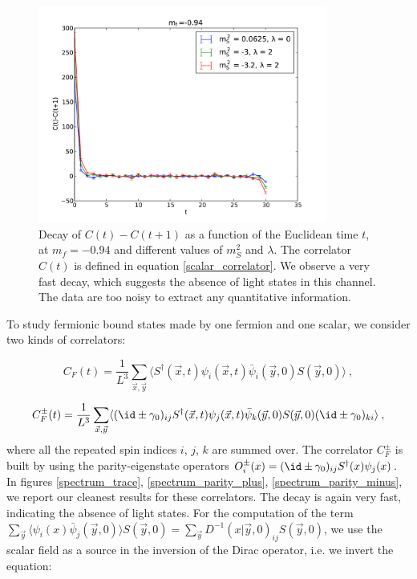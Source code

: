 \begin{figure}[thb] 
\begin{center}
  \includegraphics[width=9.5cm,clip]{pics/spectrum_scalar}  
  \end{center}
  \caption{Decay of $C(t) - C(t+1)$ as a function of the Euclidean time $t$, at $m_f = -0.94$ and different values of $m_S^2$ and $\lambda$. The correlator $C(t)$ is defined in equation \ref{scalar_correlator}. We observe a very fast decay, which suggests the absence of light states in this channel. The data are too noisy to extract any quantitative information.}
  \label{spectrum_scalar}
\end{figure}


To study fermionic bound states made by one fermion and one scalar, we consider two kinds of correlators:

\begin{equation}
C_F(t) =  \frac{1}{L^3} \sum_{\vec x,\vec y} \langle S^{\dagger}(\vec x, t) \psi_i(\vec x, t) \bar\psi_i(\vec y,0) S(\vec y,0) \rangle \: ,
\label{corr_trace}
\end{equation}


\begin{equation}
C^{\pm}_F(t) = \frac{1}{L^3} \sum_{\vec x,\vec y}\langle (\id \pm\gamma_0)_{ij} S^{\dagger}(\vec x,t) \psi_j(\vec x,t)\bar\psi_k(\vec y,0)S(\vec y,0) (\id \pm \gamma_0)_{ki} \rangle \: ,
\label{corr_pm}
\end{equation}
%
where all the repeated spin indices $i$, $j$, $k$ are summed over. The correlator $C^{\pm}_F$ is built by using the parity-eigenstate operators $O^{\pm}_i(x) = (\id \pm \gamma_0)_{ij} S^{\dagger}(x) \psi_j (x)$. In figures \ref{spectrum_trace}, \ref{spectrum_parity_plus}, \ref{spectrum_parity_minus}, we report our cleanest results for these correlators. The decay is again very fast, indicating the absence of light states. For the computation of the term $\sum_{\vec y}\langle \psi_i(x) \bar \psi_j(\vec y, 0)  \rangle S(\vec y,0) = \sum_{\vec y}D^{-1}(x \vert \vec y,0)_{ij} S(\vec y, 0)$, we use the scalar field as a source in the inversion of the Dirac operator, i.e. we invert the equation:

